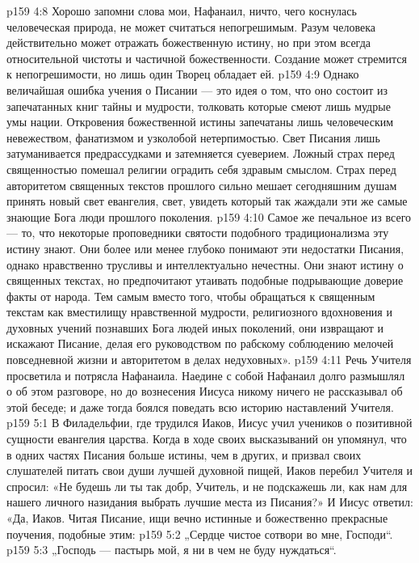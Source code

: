 \vs p159 4:8 Хорошо запомни слова мои, Нафанаил, ничто, чего коснулась человеческая природа, не может считаться непогрешимым. Разум человека действительно может отражать божественную истину, но при этом всегда относительной чистоты и частичной божественности. Создание может стремится к непогрешимости, но лишь один Творец обладает ей.
\vs p159 4:9 Однако величайшая ошибка учения о Писании --- это идея о том, что оно состоит из запечатанных книг тайны и мудрости, толковать которые смеют лишь мудрые умы нации. Откровения божественной истины запечатаны лишь человеческим невежеством, фанатизмом и узколобой нетерпимостью. Свет Писания лишь затуманивается предрассудками и затемняется суеверием. Ложный страх перед священностью помешал религии оградить себя здравым смыслом. Страх перед авторитетом священных текстов прошлого сильно мешает сегодняшним душам принять новый свет евангелия, свет, увидеть который так жаждали эти же самые знающие Бога люди прошлого поколения.
\vs p159 4:10 Самое же печальное из всего --- то, что некоторые проповедники святости подобного традиционализма эту истину знают. Они более или менее глубоко понимают эти недостатки Писания, однако нравственно трусливы и интеллектуально нечестны. Они знают истину о священных текстах, но предпочитают утаивать подобные подрывающие доверие факты от народа. Тем самым вместо того, чтобы обращаться к священным текстам как вместилищу нравственной мудрости, религиозного вдохновения и духовных учений познавших Бога людей иных поколений, они извращают и искажают Писание, делая его руководством по рабскому соблюдению мелочей повседневной жизни и авторитетом в делах недуховных».
\vs p159 4:11 \pc Речь Учителя просветила и потрясла Нафанаила. Наедине с собой Нафанаил долго размышлял о об этом разговоре, но до вознесения Иисуса никому ничего не рассказывал об этой беседе; и даже тогда боялся поведать всю историю наставлений Учителя.
\vs p159 5:1 В Филадельфии, где трудился Иаков, Иисус учил учеников о позитивной сущности евангелия царства. Когда в ходе своих высказываний он упомянул, что в одних частях Писания больше истины, чем в других, и призвал своих слушателей питать свои души лучшей духовной пищей, Иаков перебил Учителя и спросил: «Не будешь ли ты так добр, Учитель, и не подскажешь ли, как нам для нашего личного назидания выбрать лучшие места из Писания?» И Иисус ответил: «Да, Иаков. Читая Писание, ищи вечно истинные и божественно прекрасные поучения, подобные этим:
\vs p159 5:2 „Сердце чистое сотвори во мне, Господи“.
\vs p159 5:3 \pc „Господь --- пастырь мой, я ни в чем не буду нуждаться“.
